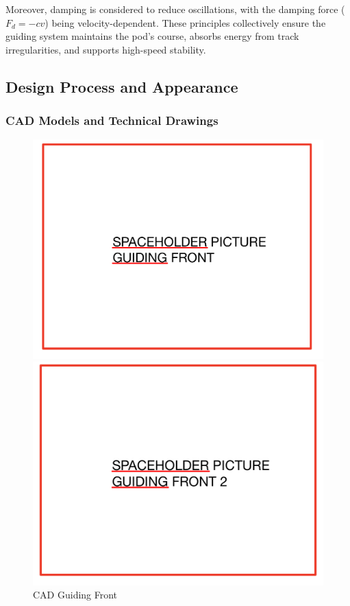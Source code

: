 Moreover, damping is considered to reduce oscillations, with the damping force (\( F_d = -cv \)) being velocity-dependent. These principles collectively ensure the guiding system maintains the pod's course, absorbs energy from track irregularities, and supports high-speed stability.


\subsection{Design Process and Appearance}
\subsubsection{CAD Models and Technical Drawings}

\begin{figure}[!ht]
  \centering
  \begin{minipage}[b]{0.45\linewidth}
    \includegraphics[width=\linewidth]{texfiles/mech/eimg/guiding/guiding_front_1.jpg}
    \caption{CAD Guiding Front}
    \label{fig:guiding_front}
  \end{minipage}
  \hspace{0.5cm}
  \begin{minipage}[b]{0.45\linewidth}
    \includegraphics[width=\linewidth]{texfiles/mech/eimg/guiding/guiding_front_2.jpg}

\end{minipage}
\end{figure}
